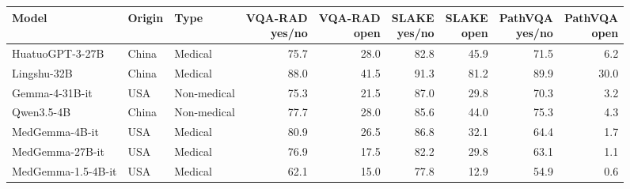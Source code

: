 \begin{tabular}{@{}lllrrrrrr@{}}
\toprule
Model & Origin & Type & \thead{VQA-RAD\\yes/no} & \thead{VQA-RAD\\open} & \thead{SLAKE\\yes/no} & \thead{SLAKE\\open} & \thead{PathVQA\\yes/no} & \thead{PathVQA\\open} \\
\midrule
HuatuoGPT-3-27B & China & Medical & 75.7 & 28.0 & 82.8 & 45.9 & 71.5 & 6.2 \\
Lingshu-32B & China & Medical & 88.0 & 41.5 & 91.3 & 81.2 & 89.9 & 30.0 \\
Gemma-4-31B-it & USA & Non-medical & 75.3 & 21.5 & 87.0 & 29.8 & 70.3 & 3.2 \\
Qwen3.5-4B & China & Non-medical & 77.7 & 28.0 & 85.6 & 44.0 & 75.3 & 4.3 \\
MedGemma-4B-it & USA & Medical & 80.9 & 26.5 & 86.8 & 32.1 & 64.4 & 1.7 \\
MedGemma-27B-it & USA & Medical & 76.9 & 17.5 & 82.2 & 29.8 & 63.1 & 1.1 \\
MedGemma-1.5-4B-it & USA & Medical & 62.1 & 15.0 & 77.8 & 12.9 & 54.9 & 0.6 \\
\bottomrule
\end{tabular}

